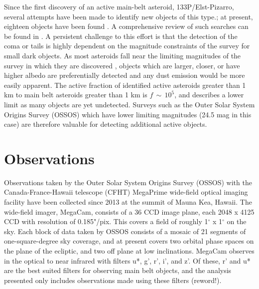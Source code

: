 \documentclass[iop,apj]{emulateapj}
\begin{document}


Since the first discovery of an active main-belt asteroid, 133P/Elst-Pizarro, several attempts have been made to identify new objects of this type.; at present, eighteen objects have been found \citep{jewitt15}. A comprehensive review of such searches can be found in .  A persistent challenge to this effort is that the detection of the coma or tails is highly dependent on the magnitude constraints of the survey for small dark objects. As most asteroids fall near the limiting magnitudes of the survey in which they are discovered \cite{jewitt15}, objects which are larger, closer, or have higher albedo are preferentially detected and any dust emission would be more easily apparent. The active fraction of identified active asteroids greater than 1 km to main belt asteroids greater than 1 km is $f \, \sim \, 10^5$, and describes a lower limit as many objects are yet undetected. \citep{jewitt15} %
Surveys such as the Outer Solar System Origins Survey (OSSOS) which have lower limiting magnitudes (24.5 mag in this case) are therefore valuable for detecting additional active objects. 





\section{Observations}

Observations taken by the Outer Solar System Origins Survey (OSSOS) with the Canada-France-Hawaii telescope (CFHT) MegaPrime wide-field optical imaging facility have been collected since 2013 at the summit of Mauna Kea, Hawaii. The wide-field imager, MegaCam, consists of a 36 CCD image plane, each 2048 x 4125 CCD with resolution of 0.185"/pix. This covers a field of  roughly 1$^{\circ}$ x 1$^{\circ}$ on the sky. Each block of data taken by OSSOS consists of a mosaic of 21 segments of one-square-degree sky coverage, and at present covers two orbital phase spaces on the plane of the ecliptic, and two off plane at low inclinations. MegaCam observes in the optical to near infrared with filters u*, g', r', i', and z'. Of these, r' and u* are the best suited filters for observing main belt objects, and the analysis presented only includes observations made using these filters (reword!). 
\end{document}
